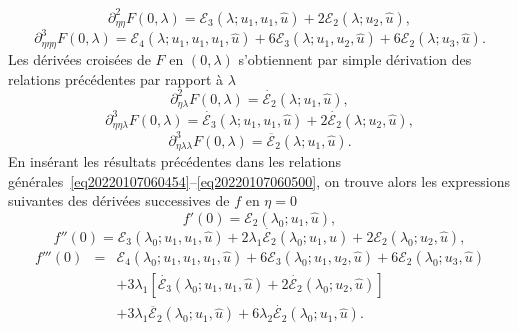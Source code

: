 \documentclass{article}
\newcommand{\nocomma}{}
\newcommand{\nosymbol}{}
\begin{document}
\begin{equation}
  \partial_{\eta \nocomma \eta}^2 F (0, \lambda) =\mathcal{E}_3 (\lambda ;
  u_1, u_1, \hat{u}) + 2\mathcal{E}_2 (\lambda ; u_2, \hat{u}),
\end{equation}
\begin{equation}
  \partial_{\eta \nocomma \eta \nocomma \eta}^3 F (0, \lambda) =\mathcal{E}_4
  (\lambda ; u_1, u_1, u_1, \hat{u}) + 6\mathcal{E}_3 (\lambda ; u_1, u_2,
  \hat{u}) + 6\mathcal{E}_2 (\lambda ; u_3, \hat{u}) .
\end{equation}
Les d{\'e}riv{\'e}es crois{\'e}es de $F$ en $(0, \lambda)$ s'obtiennent par
simple d{\'e}rivation des relations pr{\'e}c{\'e}dentes par rapport {\`a}
$\lambda$
\begin{equation}
  \partial_{\eta \nocomma \lambda}^2 F (0, \lambda) = \dot{\mathcal{E}_2}
  (\lambda ; u_1, \hat{u}),
\end{equation}
\begin{equation}
  \partial_{\eta \nocomma \eta \nocomma \lambda}^3 F (0, \lambda) =
  \dot{\mathcal{E}_3} (\lambda ; u_1, u_1, \hat{u}) + 2 \dot{\mathcal{E}_2}
  (\lambda ; u_2, \hat{u}),
\end{equation}
\begin{equation}
  \partial_{\eta \nocomma \lambda \nocomma \lambda}^3 F (0, \lambda) =
  \ddot{\mathcal{E}_2} (\lambda ; u_1, \hat{u}) .
\end{equation}
En ins{\'e}rant les r{\'e}sultats pr{\'e}c{\'e}dentes dans les relations
g{\'e}n{\'e}rales~\eqref{eq20220107060454}--\eqref{eq20220107060500}, on
trouve alors les expressions suivantes des d{\'e}riv{\'e}es successives de $f$
en $\eta = 0$
\begin{equation}
  f' (0) =\mathcal{E}_2 (\lambda_0 ; u_1, \hat{u}),
\end{equation}
\begin{equation}
  f'' (0) =\mathcal{E}_3 (\lambda_0 ; u_1, u_1, \hat{u}) + 2 \lambda_1 
  \dot{\mathcal{E}_2} (\lambda_0 ; u_1, \hat{u}) + 2\mathcal{E}_2 (\lambda_0 ;
  u_2, \hat{u}),
\end{equation}
\begin{eqnarray}
  f''' (0) & = & \mathcal{E}_4 (\lambda_0 ; u_1, u_1, u_1, \hat{u}) +
  6\mathcal{E}_3 (\lambda_0 ; u_1, u_2, \hat{u}) + 6\mathcal{E}_2 (\lambda_0 ;
  u_3, \hat{u}) \nonumber\\
  &  & \nosymbol + 3 \lambda_1  [\dot{\mathcal{E}_3} (\lambda_0 ; u_1, u_1,
  \hat{u}) + 2 \dot{\mathcal{E}_2} (\lambda_0 ; u_2, \hat{u})] \nonumber\\
  &  & \nosymbol + 3 \lambda_1   \ddot{\mathcal{E}_2} (\lambda_0 ; u_1,
  \hat{u}) + 6 \lambda_2  \dot{\mathcal{E}_2} (\lambda_0 ; u_1, \hat{u}) . 
\end{eqnarray}
\end{document}
